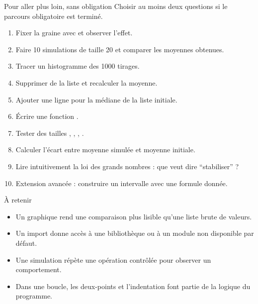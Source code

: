 \documentclass[11pt,a4paper]{article}
\begin{document}
\begin{extensionexercise}{Pour aller plus loin, sans obligation}
Choisir au moins deux questions si le parcours obligatoire est terminé.
\begin{enumerate}
  \item Fixer la graine avec  et observer l'effet.
  \item Faire 10 simulations de taille 20 et comparer les moyennes obtenues.
  \item Tracer un histogramme des 1000 tirages.
  \item Supprimer  de la liste et recalculer la moyenne.
  \item Ajouter une ligne pour la médiane de la liste initiale.
  \item Écrire une fonction .
  \item Tester des tailles , , , .
  \item Calculer l'écart entre moyenne simulée et moyenne initiale.
  \item Lire intuitivement la loi des grands nombres : que veut dire “stabiliser” ?
  \item Extension avancée : construire un intervalle  avec une formule donnée.
\end{enumerate}
\end{extensionexercise}

\begin{takeawaybox}{À retenir}
\begin{itemize}
  \item Un graphique rend une comparaison plus lisible qu'une liste brute de valeurs.
  \item Un import donne accès à une bibliothèque ou à un module non disponible par défaut.
  \item Une simulation répète une opération contrôlée pour observer un comportement.
  \item Dans une boucle, les deux-points et l'indentation font partie de la logique du programme.
\end{itemize}
\end{takeawaybox}
\end{document}

